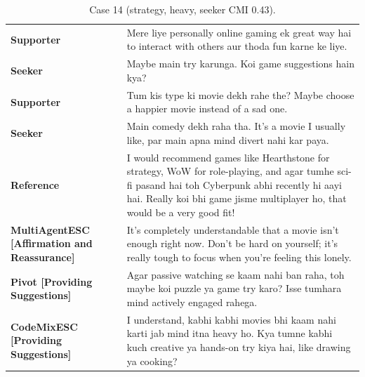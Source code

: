 \begin{table}[t]
\centering\footnotesize
\caption{Case 14 (strategy, heavy, seeker CMI 0.43).}
\label{tab:case14}
\begin{tabular}{@{}p{}p{}@{}}
\toprule
\textbf{Supporter} & Mere liye personally online gaming ek great way hai to interact with others aur thoda fun karne ke liye. \\
\textbf{Seeker} & Maybe main try karunga. Koi game suggestions hain kya? \\
\textbf{Supporter} & Tum kis type ki movie dekh rahe the? Maybe choose a happier movie instead of a sad one. \\
\textbf{Seeker} & Main comedy dekh raha tha. It's a movie I usually like, par main apna mind divert nahi kar paya. \\
\textbf{Reference} & I would recommend games like Hearthstone for strategy, WoW for role-playing, and agar tumhe sci-fi pasand hai toh Cyberpunk abhi recently hi aayi hai. Really koi bhi game jisme multiplayer ho, that would be a very good fit! \\
\textbf{MultiAgentESC [Affirmation and Reassurance]} & It’s completely understandable that a movie isn't enough right now. Don't be hard on yourself; it's really tough to focus when you're feeling this lonely. \\
\textbf{Pivot [Providing Suggestions]} & Agar passive watching se kaam nahi ban raha, toh maybe koi puzzle ya game try karo? Isse tumhara mind actively engaged rahega. \\
\textbf{CodeMixESC [Providing Suggestions]} & I understand, kabhi kabhi movies bhi kaam nahi karti jab mind itna heavy ho. Kya tumne kabhi kuch creative ya hands-on try kiya hai, like drawing ya cooking? \\
\bottomrule
\end{tabular}
\end{table}

